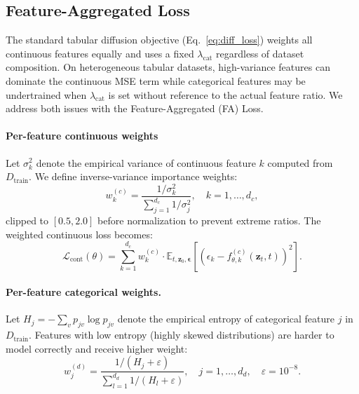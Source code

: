 \documentclass[preprint,12pt]{elsarticle}
\begin{document}
\subsection{Feature-Aggregated Loss}
\label{sec:method_faloss}

The standard tabular diffusion objective (Eq.~\ref{eq:diff_loss}) weights all continuous features equally and uses a fixed $\lambda_{\text{cat}}$ regardless of dataset composition. On heterogeneous tabular datasets, high-variance features can dominate the continuous MSE term while categorical features may be undertrained when $\lambda_{\text{cat}}$ is set without reference to the actual feature ratio. We address both issues with the Feature-Aggregated (FA) Loss.

\paragraph{Per-feature continuous weights}
Let $\sigma_k^2$ denote the empirical variance of continuous feature $k$ computed from $D_{\text{train}}$. We define inverse-variance importance weights:
\begin{equation}
w_k^{(c)} = \frac{1/\sigma_k^2}{\sum_{j=1}^{d_c} 1/\sigma_j^2}, \quad k = 1, \dots, d_c,
\label{eq:fa_cont_weights}
\end{equation}
clipped to $[0.5, 2.0]$ before normalization to prevent extreme ratios. The weighted continuous loss becomes:
\begin{equation}
\mathcal{L}_{\text{cont}}(\theta) = \sum_{k=1}^{d_c} w_k^{(c)} \cdot \mathbb{E}_{t, \mathbf{z}_0, \boldsymbol{\epsilon}}\!\left[\left(\epsilon_k - f_{\theta,k}^{(c)}(\mathbf{z}_t, t)\right)^2\right].
\label{eq:fa_cont_loss}
\end{equation}

\paragraph{Per-feature categorical weights.}
Let $H_j = -\sum_v p_{jv} \log p_{jv}$ denote the empirical entropy of categorical feature $j$ in $D_{\text{train}}$. Features with low entropy (highly skewed distributions) are harder to model correctly and receive higher weight:
\begin{equation}
w_j^{(d)} = \frac{1/(H_j + \varepsilon)}{\sum_{l=1}^{d_d} 1/(H_l + \varepsilon)}, \quad j = 1, \dots, d_d, \quad \varepsilon = 10^{-8}.
\label{eq:fa_cat_weights}
\end{equation}
\end{document}
